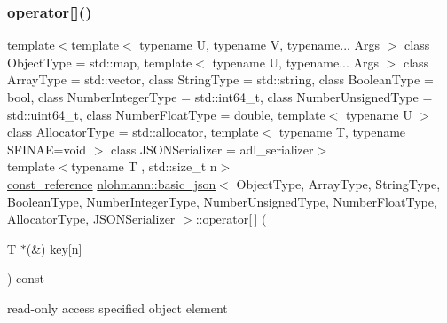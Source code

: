 \subsubsection{\texorpdfstring{operator[]()}{operator[]()}\hspace{0.1cm}{\footnotesize\ttfamily [6/10]}}
{\footnotesize\ttfamily template$<$template$<$ typename U, typename V, typename... Args $>$ class Object\+Type = std\+::map, template$<$ typename U, typename... Args $>$ class Array\+Type = std\+::vector, class String\+Type  = std\+::string, class Boolean\+Type  = bool, class Number\+Integer\+Type  = std\+::int64\+\_\+t, class Number\+Unsigned\+Type  = std\+::uint64\+\_\+t, class Number\+Float\+Type  = double, template$<$ typename U $>$ class Allocator\+Type = std\+::allocator, template$<$ typename T, typename S\+F\+I\+N\+A\+E=void $>$ class J\+S\+O\+N\+Serializer = adl\+\_\+serializer$>$ \\
template$<$typename T , std\+::size\+\_\+t n$>$ \\
\mbox{\hyperlink{classnlohmann_1_1basic__json_a4057c5425f4faacfe39a8046871786ca}{const\+\_\+reference}} \mbox{\hyperlink{classnlohmann_1_1basic__json}{nlohmann\+::basic\+\_\+json}}$<$ Object\+Type, Array\+Type, String\+Type, Boolean\+Type, Number\+Integer\+Type, Number\+Unsigned\+Type, Number\+Float\+Type, Allocator\+Type, J\+S\+O\+N\+Serializer $>$\+::operator\mbox{[}$\,$\mbox{]} (\begin{DoxyParamCaption}\item[{T $\ast$(\&)}]{key\mbox{[}n\mbox{]} }\end{DoxyParamCaption}) const\hspace{0.3cm}{\ttfamily [inline]}}



read-\/only access specified object element 

